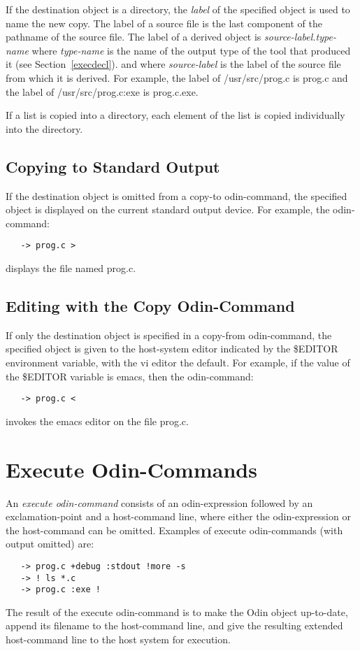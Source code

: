 If the destination object is a directory,
the {\em label} of the specified object is used to name the new copy.
The label of a source file is
the last component of the pathname of the source file.
The label of a derived object is {\em source-label.type-name}
where {\em type-name} is the name of the output type
of the tool that produced it (see Section~\ref{execdecl}).
and where {\em source-label} is the label of the source file
from which it is derived.
For example, the label of {\ex /usr/src/prog.c} is {\ex prog.c} and
the label of {\ex /usr/src/prog.c:exe} is {\ex prog.c.exe}.

If a list is copied into a directory,
each element of the list is copied individually into the directory.

\subsection{Copying to Standard Output}

If the destination object is omitted from a copy-to odin-command,
the specified object is displayed on the current standard output device.
For example, the odin-command:
\begin{verbatim}
   -> prog.c >
\end{verbatim}
displays the file named {\ex prog.c}.

\subsection{Editing with the Copy Odin-Command}

If only the destination object is specified in a copy-from odin-command,
the specified object is given to the host-system editor
indicated by the {\ex \$EDITOR} environment variable,
with the {\ex vi} editor the default.
For example, if the value of the {\ex \$EDITOR} variable is {\ex emacs},
then the odin-command:
\begin{verbatim}
   -> prog.c <
\end{verbatim}
invokes the {\ex emacs} editor on the file {\ex prog.c}.


\section{Execute Odin-Commands}
\label{execute}

An {\em execute odin-command} consists of an odin-expression followed by
an exclamation-point and a host-command line,
where either the odin-expression or the host-command can be omitted.
Examples of execute odin-commands (with output omitted) are:
\begin{verbatim}
   -> prog.c +debug :stdout !more -s
   -> ! ls *.c
   -> prog.c :exe !
\end{verbatim}
The result of the execute odin-command is to make the Odin object up-to-date,
append its filename to the host-command line,
and give the resulting extended host-command line
to the host system for execution.

